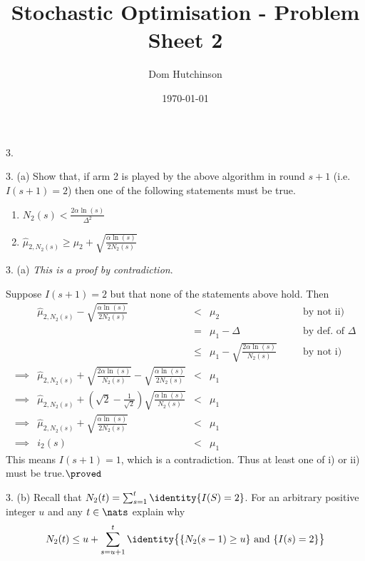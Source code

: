 \documentclass[11pt,a4paper]{article}
\begin{document}

\title{Stochastic Optimisation - Problem Sheet 2}
\author{Dom Hutchinson}
\date{\today}
\maketitle


\begin{question}{3.}

\end{question}

\begin{question}{3. (a)}
  Show that, if arm 2 is played by the above algorithm in round $s+1$ (i.e. $I(s+1)=2$) then one of the following statements must be true.
  \begin{enumerate}
    \item $\displaystyle N_2(s)<\frac{2\alpha\ln(s)}{\Delta^2}$
    \item $\displaystyle\hat\mu_{2,N_2(s)}\geq\mu_2+\sqrt{\frac{\alpha\ln(s)}{2N_2(s)}}$
  \end{enumerate}
\end{question}

\begin{answer}{3. (a)}
  \textit{This is a proof by contradiction}.
  \par Suppose $I(s+1)=2$ but that none of the statements above hold. Then
  \[\begin{array}{rrclcl}
    &\hat\mu_{2,N_2(s)}-\sqrt{\frac{\alpha\ln(s)}{2N_2(s)}}&<&\mu_2&\quad&\text{by not ii)}\\
    &&=&\mu_1-\Delta&&\text{by def. of }\Delta\\
    &&\leq&\mu_1-\sqrt{\frac{2\alpha\ln(s)}{N_2(s)}}&&\text{by not i)}\\
    \implies&\hat\mu_{2,N_2(s)}+\sqrt{\frac{2\alpha\ln(s)}{N_2(s)}}-\sqrt{\frac{\alpha\ln(s)}{2N_2(s)}}&<&\mu_1\\
    \implies&\hat\mu_{2,N_2(s)}+\left(\sqrt2-\frac1{\sqrt2}\right)\sqrt{\frac{\alpha\ln(s)}{N_2(s)}}&<&\mu_1\\
    \implies&\hat\mu_{2,N_2(s)}+\sqrt{\frac{\alpha\ln(s)}{2N_2(s)}}&<&\mu_1\\
    \implies&i_2(s)&<&\mu_1
  \end{array}\]
  This means $I(s+1)=1$, which is a contradiction. Thus at least one of i) or ii) must be true.$\proved$
\end{answer}

\begin{question}{3. (b)}
  Recall that $N_2(t)=\sum_{s=1}^t\identity\{I(S)=2\}$. For an arbitrary positive integer $u$ and any $t\in\nats$ explain why
  \[ N_2(t)\leq u+\sum_{s=u+1}^t\identity\big\{\{N_2(s-1)\geq u\}\text{ and }\{I(s)=2\}\big\} \]
\end{question}
\end{document}
